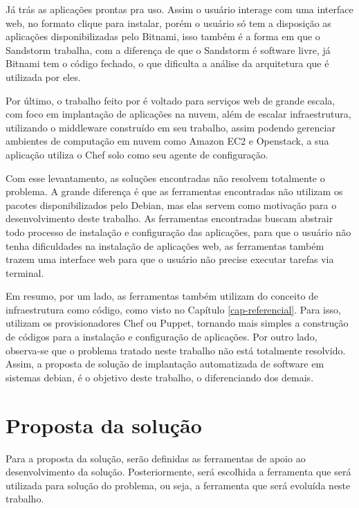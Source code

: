 Já  trás as aplicações prontas pra uso. Assim o usuário interage com 
uma interface web, no formato clique para instalar, porém
o usuário só tem a disposição as aplicações disponibilizadas pelo Bitnami, isso
também é a forma em que o Sandstorm trabalha, com a diferença de que o Sandstorm é
software livre, já Bitnami tem o código fechado, o que dificulta a análise da arquitetura
que é utilizada por eles. 

Por último, o trabalho feito por  é voltado
para serviços web de grande escala, com foco em implantação de aplicações na
nuvem, além  de escalar infraestrutura, utilizando o middleware construído em seu trabalho, 
assim podendo gerenciar ambientes de computação em nuvem como Amazon EC2 e 
Openstack, a sua aplicação utiliza o Chef solo como seu agente de configuração.

Com esse levantamento, as soluções encontradas não resolvem totalmente
o problema. A grande diferença é que as ferramentas encontradas não utilizam os pacotes
disponibilizados pelo Debian, mas elas servem como motivação para o desenvolvimento
deste trabalho. As ferramentas encontradas buscam
abstrair todo processo de instalação e configuração das aplicações, para que o
usuário não tenha dificuldades na instalação de aplicações web, as ferramentas também
trazem uma interface web para que o usuário não precise executar tarefas via terminal.

Em resumo, por um lado, as ferramentas também utilizam do conceito de
infraestrutura como código, como visto no Capítulo \ref{cap-referencial}. Para
isso, utilizam os provisionadores Chef ou Puppet, tornando mais simples a
construção de códigos para a instalação e configuração de aplicações. Por outro lado, 
observa-se que o problema tratado neste trabalho não está totalmente resolvido. Assim, 
a proposta de solução de implantação automatizada de software em sistemas debian, 
é o objetivo deste trabalho, 
o diferenciando dos demais.

\section{Proposta da solução}
\label{section:construcao}

Para a proposta da solução, serão definidas as ferramentas
de apoio ao desenvolvimento da solução. Posteriormente, será escolhida a ferramenta
que será utilizada para solução do problema, ou seja, a ferramenta que será evoluída
neste trabalho.

